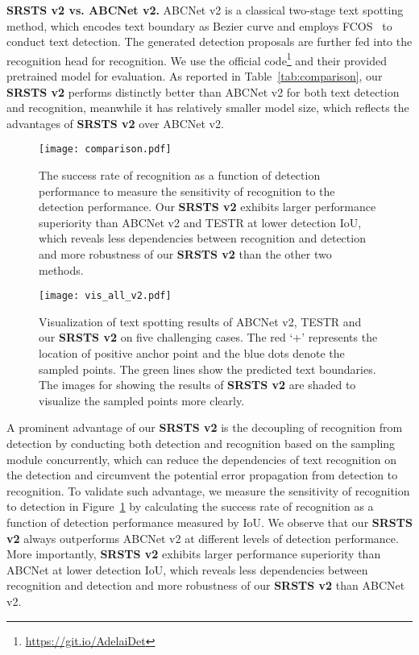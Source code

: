  

\smallskip\noindent\textbf{\textbf{SRSTS v2} vs. ABCNet v2.} ABCNet v2 is a classical two-stage text spotting method, which encodes text boundary as Bezier curve and employs FCOS~\cite{tian2019fcos} to conduct text detection. The generated detection proposals are further fed into the recognition head for recognition. We use the official code\footnote{\label{website}\url{https://git.io/AdelaiDet}} and their provided pretrained model for evaluation. As reported in Table~\ref{tab:comparison}, our \textbf{SRSTS v2} performs distinctly better than ABCNet v2 for both text detection and recognition, meanwhile it has relatively smaller model size, which reflects the advantages of \textbf{SRSTS v2} over ABCNet v2. 

\begin{figure}[!t] 
\renewcommand{\arraystretch}{1.1}
   \centering
   \centerline{\texttt{[image: comparison.pdf]}}
  \caption{The success rate of recognition as a function of detection performance to measure the sensitivity of recognition to the detection performance. Our \textbf{SRSTS v2} exhibits larger performance superiority than ABCNet v2 and TESTR at lower detection IoU, which reveals less dependencies between recognition and detection and more robustness of our \textbf{SRSTS v2} than the other two methods.}
  \label{fig:sensitivity}
\end{figure}


\begin{figure*}[!t] 
   \centering  \centerline{\texttt{[image: vis\_all\_v2.pdf]}}
  \caption{Visualization of text spotting results of ABCNet v2, TESTR and our \textbf{SRSTS v2} on five challenging cases. The \textcolor[RGB]{255,0,0}{red} ‘$+$’ represents the location of positive anchor point and the \textcolor[RGB]{0,0,255}{blue} dots denote the sampled points. The \textcolor[RGB]{0,255,0}{green} lines show the predicted text boundaries. The images for showing the results of \textbf{SRSTS v2} are shaded to visualize the sampled points more clearly.} 
  \label{fig:vis}
\end{figure*}

A prominent advantage of our \textbf{SRSTS v2} is the decoupling of recognition from detection by conducting both detection and recognition based on the sampling module concurrently, which can reduce the dependencies of text recognition on the detection and circumvent the potential error propagation from detection to recognition. To validate such advantage, we measure the sensitivity of recognition to detection in Figure~\ref{fig:sensitivity} by calculating the success rate of recognition as a function of detection performance measured by IoU. We observe that our \textbf{SRSTS v2} always outperforms ABCNet v2 at different levels of detection performance. More importantly, \textbf{SRSTS v2} exhibits larger performance superiority than ABCNet at lower detection IoU, which reveals less dependencies between recognition and detection and more robustness of our \textbf{SRSTS v2} than ABCNet v2.




